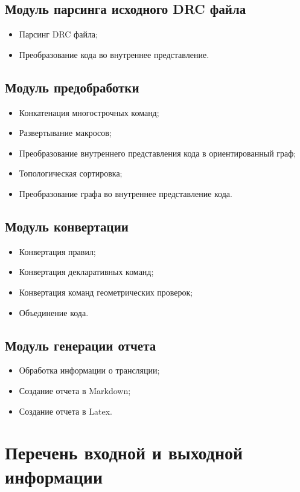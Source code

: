 \subsection{Модуль парсинга исходного DRC файла}
\begin{itemize}
	\item Парсинг DRC файла;
	\item Преобразование кода во внутреннее представление.
\end{itemize}

\subsection{Модуль предобработки}
\begin{itemize}
	\item Конкатенация многострочных команд;
	\item Развертывание макросов;
	\item Преобразование внутреннего представления кода в ориентированный граф;
	\item Топологическая сортировка;
	\item Преобразование графа во внутреннее представление кода.
\end{itemize}

\subsection{Модуль конвертации}
\begin{itemize}
	\item Конвертация правил;
	\item Конвертация декларативных команд;
	\item Конвертация команд геометрических проверок;
	\item Объединение кода.
\end{itemize}

\subsection{Модуль генерации отчета}
\begin{itemize}
	\item Обработка информации о трансляции;
	\item Создание отчета в Markdown;
	\item Создание отчета в Latex.
\end{itemize}


\section{Перечень входной и выходной информации}

